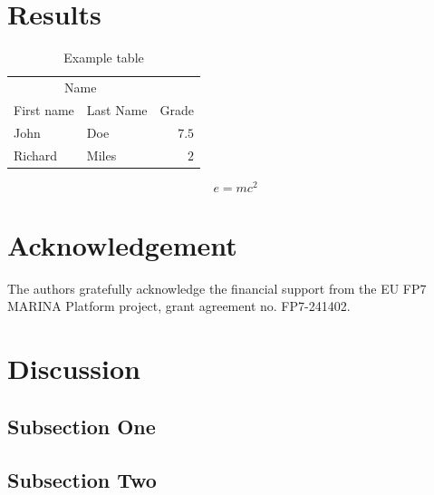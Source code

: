 \documentclass[twocolumn]{article}
\begin{document}

\section{Results}

\begin{table}[H]
\caption{Example table}
\centering
\begin{tabular}{llr}
\toprule
\multicolumn{2}{c}{Name} \\
\cmidrule(r){1-2}
First name & Last Name & Grade \\
\midrule
John & Doe & $7.5$ \\
Richard & Miles & $2$ \\
\bottomrule
\end{tabular}
\end{table}

\lipsum[5] %

\begin{equation}
\label{eq:emc}
e = mc^2
\end{equation}

\lipsum[6] %


\section*{Acknowledgement} %
\label{sec:acknowledgement}

The authors gratefully acknowledge the financial support
from the EU FP7 MARINA Platform project, grant agreement no. FP7-241402.

\section{Discussion}

\subsection{Subsection One}

\lipsum[7] %

\subsection{Subsection Two}

\lipsum[8] %

\end{document}
